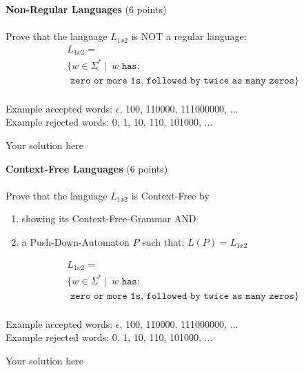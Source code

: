 \documentclass[12pt]{article}
\newenvironment{question}[2][Question]{\begin{trivlist}
\item[\hskip \labelsep {\bfseries #1}\hskip \labelsep {\bfseries #2.}]}{\end{trivlist}}
\newenvironment{solution}[1][Solution:]{\begin{trivlist}
\item[\hskip \labelsep {\bfseries #1}\hskip \labelsep {\bfseries}]\color{blue}}{\end{trivlist}}
\begin{document}
\begin{question}{6}\textbf{Non-Regular Languages} (6 points)\\\\
Prove that the language $L_{1x2}$ is NOT a regular language:
    \begin{align*}
        &L_{1x2} = \\
        &\{ w \in \Sigma^* \ \vert \;  \ w  \texttt{ has: } \\
        &\texttt{ zero or more 1s, followed by twice as many zeros}
        \}\\
    \end{align*}

Example accepted words: $\epsilon$, 100, 110000, 111000000, $\dots$ \\
Example rejected words: 0, 1, 10, 110, 101000, $\dots$

     \begin{solution}
       Your solution here
    \end{solution}

\end{question}

\newpage


\clearpage

\begin{question}{7}\textbf{Context-Free Languages} (6 points)\\\\
Prove that the language $L_{1x2}$ is Context-Free by 

\begin{enumerate}[i]
    \item showing its Context-Free-Grammar AND
    \item a Push-Down-Automaton $P$ such that: $L(P) = L_{1x2}$
\end{enumerate}

    \begin{align*}
        &L_{1x2} = \\
        &\{ w \in \Sigma^* \ \vert \;  \ w  \texttt{ has: } \\
        &\texttt{ zero or more 1s, followed by twice as many zeros}
        \}\\
    \end{align*}

Example accepted words: $\epsilon$, 100, 110000, 111000000, $\dots$ \\
Example rejected words: 0, 1, 10, 110, 101000, $\dots$

     \begin{solution}
       Your solution here
    \end{solution}


\end{question}
	
\end{document}
